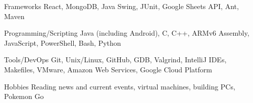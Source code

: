 

\begin{cvskills}

  \cvskill
    {Frameworks} %
    {React, MongoDB, Java Swing, JUnit, Google Sheets API, Ant, Maven} %

  \cvskill
    {Programming/Scripting} %
    {Java (including Android), C, C++, ARMv6 Assembly, JavaScript, PowerShell, Bash, Python} %
    
  \cvskill
    {Tools/DevOps} %
    {Git, Unix/Linux, GitHub, GDB, Valgrind, IntelliJ IDEs, Makefiles, VMware, Amazon Web Services, Google Cloud Platform} %

  \cvskill
  {Hobbies} %
  {Reading news and current events, virtual machines, building PCs, Pokemon Go} %

\end{cvskills}

